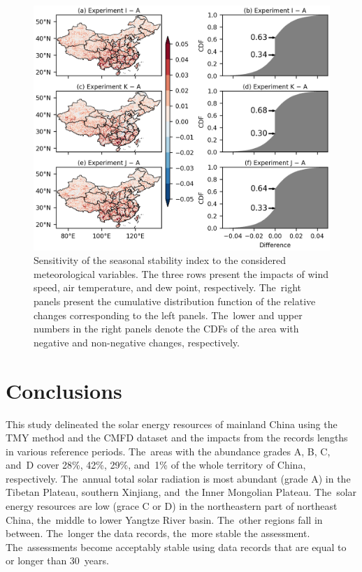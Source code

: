 \documentclass[atmosphere,article,accept,pdftex,moreauthors]{Definitions/mdpi}
\begin{document}
\begin{figure}[H]
  \includegraphics[width=13.8cm]{fig/tmy-sea-var-sensitivity.png}
  \caption{Sensitivity of the seasonal stability index to the considered meteorological variables. The three rows present the impacts of wind speed, air temperature, and dew point, respectively. The~right panels present the cumulative distribution function of the relative changes corresponding to the left panels. The~lower and upper numbers in the right panels denote the CDFs of the area with negative and non-negative changes, respectively. \label{fig:tmy_sea_var_sens}}
\end{figure}
\unskip

\section{Conclusions}\label{sec:conclusions}

This study delineated the solar energy resources of mainland China using the TMY method and the CMFD dataset and the impacts from the records lengths in various reference periods. The~areas with the abundance grades A, B, C, and~D cover 28\%, 42\%, 29\%, and~1\% of the whole territory of China, respectively. The~annual total solar radiation is most abundant (grade A) in the Tibetan Plateau, southern Xinjiang, and~the Inner Mongolian Plateau. The~solar energy resources are low (grace C or D) in the northeastern part of northeast China, the~middle to lower Yangtze River basin. The~other regions fall in between. The~longer the data records, the~more stable the assessment. The~assessments become acceptably stable using data records that are equal to or longer than 30~years.
\end{document}
